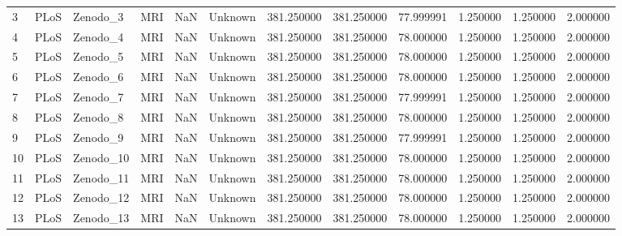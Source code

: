 \begin{tabular}{llllrlrrrrrr}
3      &            PLoS &     Zenodo\_3 &                MRI &        NaN &  Unknown &       381.250000 &    381.250000 &   77.999991 &               1.250000 &            1.250000 &          2.000000 \\
4      &            PLoS &     Zenodo\_4 &                MRI &        NaN &  Unknown &       381.250000 &    381.250000 &   78.000000 &               1.250000 &            1.250000 &          2.000000 \\
5      &            PLoS &     Zenodo\_5 &                MRI &        NaN &  Unknown &       381.250000 &    381.250000 &   78.000000 &               1.250000 &            1.250000 &          2.000000 \\
6      &            PLoS &     Zenodo\_6 &                MRI &        NaN &  Unknown &       381.250000 &    381.250000 &   78.000000 &               1.250000 &            1.250000 &          2.000000 \\
7      &            PLoS &     Zenodo\_7 &                MRI &        NaN &  Unknown &       381.250000 &    381.250000 &   77.999991 &               1.250000 &            1.250000 &          2.000000 \\
8      &            PLoS &     Zenodo\_8 &                MRI &        NaN &  Unknown &       381.250000 &    381.250000 &   78.000000 &               1.250000 &            1.250000 &          2.000000 \\
9      &            PLoS &     Zenodo\_9 &                MRI &        NaN &  Unknown &       381.250000 &    381.250000 &   77.999991 &               1.250000 &            1.250000 &          2.000000 \\
10     &            PLoS &    Zenodo\_10 &                MRI &        NaN &  Unknown &       381.250000 &    381.250000 &   78.000000 &               1.250000 &            1.250000 &          2.000000 \\
11     &            PLoS &    Zenodo\_11 &                MRI &        NaN &  Unknown &       381.250000 &    381.250000 &   78.000000 &               1.250000 &            1.250000 &          2.000000 \\
12     &            PLoS &    Zenodo\_12 &                MRI &        NaN &  Unknown &       381.250000 &    381.250000 &   78.000000 &               1.250000 &            1.250000 &          2.000000 \\
13     &            PLoS &    Zenodo\_13 &                MRI &        NaN &  Unknown &       381.250000 &    381.250000 &   78.000000 &               1.250000 &            1.250000 &          2.000000 \\

\end{tabular}
